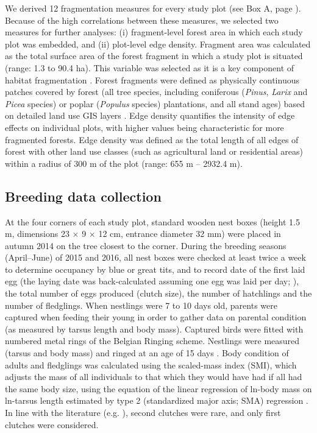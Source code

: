 \documentclass[10pt, twoside]{book} %
\begin{document}
		We derived 12 fragmentation measures for every study plot (see Box A, page \pageref{boxa}). Because of the high correlations between these measures, we selected two measures for further analyses: (i) fragment-level forest area in which each study plot was embedded, and (ii) plot-level edge density. Fragment area was calculated as the total surface area of the forest fragment in which a study plot is situated (range: 1.3 to 90.4 ha). This variable was selected as it is a key component of habitat fragmentation \citep{Ewers2007, Fischer2007}. Forest fragments were defined as physically continuous patches covered by forest (all tree species, including coniferous (\textit{Pinus}, \textit{Larix} and \textit{Picea} species) or poplar (\textit{Populus} species) plantations, and all stand ages) based on detailed land use GIS layers \citep{Vriens2011}. Edge density quantifies the intensity of edge effects on individual plots, with higher values being characteristic for more fragmented forests. Edge density was defined as the total length of all edges of forest with other land use classes (such as agricultural land or residential areas) within a radius of 300 m of the plot (range: 655 m -- 2932.4 m).\\
		
		
		\subsection*{Breeding data collection}
		
		At the four corners of each study plot, standard wooden nest boxes (height 1.5 m, dimensions 23 $\times$ 9 $\times$ 12 cm, entrance diameter 32 mm) were placed in autumn 2014 on the tree closest to the corner. During the breeding seasons (April--June) of 2015 and 2016, all nest boxes were checked at least twice a week to determine occupancy by blue or great tits, and to record date of the first laid egg (the laying date was back-calculated assuming one egg was laid per day; \citealt{Perrins1965}), the total number of eggs produced (clutch size), the number of hatchlings and the number of fledglings. When nestlings were 7 to 10 days old, parents were captured when feeding their young in order to gather data on parental condition (as measured by tarsus length and body mass). Captured birds were fitted with numbered metal rings of the Belgian Ringing scheme. Nestlings were measured (tarsus and body mass) and ringed at an age of 15 days \citep{Matthysen2011}. Body condition of adults and fledglings was calculated using the scaled-mass index (SMI), which adjusts the mass of all individuals to that which they would have had if all had the same body size, using the equation of the linear regression of ln-body mass on ln-tarsus length estimated by type 2 (standardized major axis; SMA) regression \citep{Peig2009}. In line with the literature (e.g. \citealt{Matthysen2011, Wilkin2006}), second clutches were rare, and only first clutches were considered.
		
\end{document}
